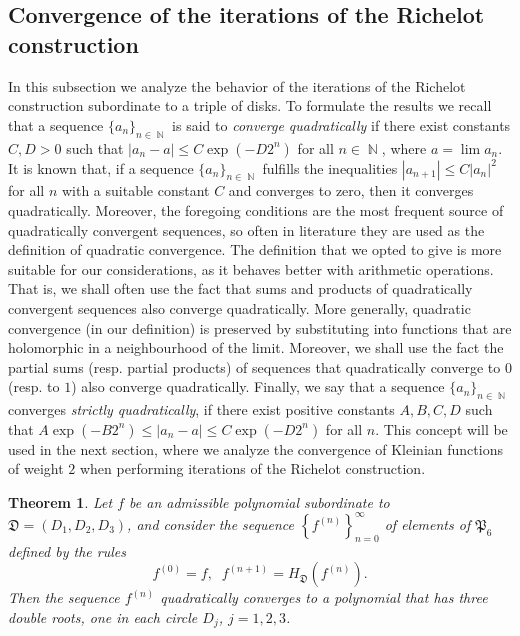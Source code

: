 \documentclass{amsart}
\numberwithin{equation}{section}
\newtheorem{theorem}{Theorem}[section]
\theoremstyle{definition}
\theoremstyle{remark}
\DeclareMathOperator{\NN}{\mathbb N}
\begin{document}
	\subsection{Convergence of the iterations of the Richelot construction}
	In this subsection we analyze the behavior of the iterations of the Richelot construction subordinate to a triple of disks. To formulate the results we recall that a sequence $\{a_n\}_{n \in \NN}$ is said to {\it{converge quadratically}} if there exist constants $C, D> 0$ such that $|a_n - a| \le C\exp(-D2^n)$ for all $n \in \NN$, where $a = \lim a_n$. It is known that, if a sequence $\{a_n\}_{n \in \NN}$ fulfills the  inequalities $|a_{n+1}| \le C|a_n|^2$ for all $n$ with a suitable constant $C$ and converges to zero, then it converges quadratically. Moreover, the foregoing conditions are the most frequent source of quadratically convergent sequences, so often in literature they are used as the definition of quadratic convergence. The definition that we opted to give is more suitable for our considerations, as it behaves better with arithmetic operations. That is, we shall often use the fact that sums and products of quadratically convergent sequences also converge quadratically. More generally, quadratic convergence (in our definition) is preserved by substituting into functions that are holomorphic in a neighbourhood of the limit. Moreover, we shall use the fact the partial sums (resp. partial products) of sequences that quadratically converge to $0$ (resp. to $1$) also converge quadratically. Finally, we say that a sequence $\{a_n\}_{n \in \NN}$ converges {\it{strictly quadratically}}, if there exist positive constants $A,B,C,D$ such that $A\exp(-B2^n)\le|a_n - a| \le C\exp(-D2^n)$ for all $n$. This concept will be used in the next section, where we analyze the convergence of Kleinian functions of weight $2$ when performing iterations of the Richelot construction.
	
	\begin{theorem}\label{thConvergenceOfPolynomials}
		Let $f$ be an admissible polynomial subordinate to $\mathfrak D = (D_1, D_2, D_3)$, and consider the sequence $\left\{f^{(n)}\right\}_{n = 0}^{\infty}$ of elements of $\mathfrak P_6$ defined by the rules  
		\begin{equation}\label{eqDefRichSeq}
			f^{(0)} = f,\;\;f^{(n+1)} = H_{\mathfrak D}\left(f^{(n)}\right).
		\end{equation}
		Then the sequence $f^{(n)}$ quadratically converges to a polynomial that has three double roots, one in each circle $D_j$, $j = 1,2,3$.
	\end{theorem}
	
\end{document}
